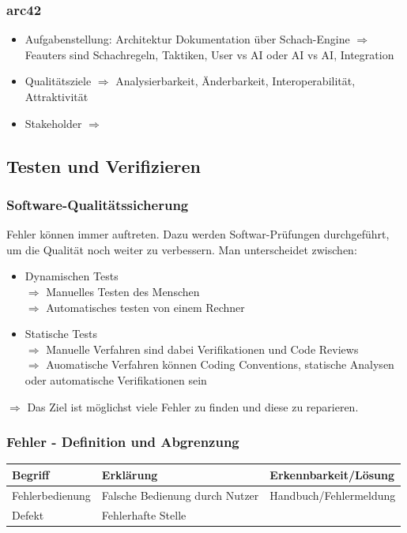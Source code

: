 \documentclass[a4paper,10pt]{scrartcl}
\begin{document}
\subsubsection{arc42}
\begin{itemize}
    \item Aufgabenstellung: Architektur Dokumentation über Schach-Engine
    $\Rightarrow$ Feauters sind Schachregeln, Taktiken, User vs AI oder AI vs AI, Integration
    \item Qualitätsziele
    $\Rightarrow$ Analysierbarkeit, Änderbarkeit, Interoperabilität, Attraktivität
    \item Stakeholder
    $\Rightarrow$
\end{itemize}

\subsection{Testen und Verifizieren}
\subsubsection{Software-Qualitätssicherung}
Fehler können immer auftreten. Dazu werden Softwar-Prüfungen durchgeführt, um die Qualität noch weiter zu verbessern. Man unterscheidet zwischen:
\begin{itemize}
    \item Dynamischen Tests\\
    $\Rightarrow$ Manuelles Testen des Menschen\\ 
    $\Rightarrow$ Automatisches testen von einem Rechner
    \item Statische Tests\\
    $\Rightarrow$ Manuelle Verfahren sind dabei Verifikationen und Code Reviews\\
    $\Rightarrow$ Auomatische Verfahren können Coding Conventions, statische Analysen oder automatische Verifikationen sein
\end{itemize}
$\Rightarrow$ Das Ziel ist möglichst viele Fehler zu finden und diese zu reparieren.
\subsubsection{Fehler - Definition und Abgrenzung}
\begin{table}[h]
    \begin{tabular}{|l|l|l|} \hline
Begriff & Erklärung & Erkennbarkeit/Lösung \\\hline
Fehlerbedienung & Falsche Bedienung durch Nutzer & Handbuch/Fehlermeldung\\\hline
Defekt & Fehlerhafte Stelle &               \\\hline
    \end{tabular}
\end{table}
\end{document}
